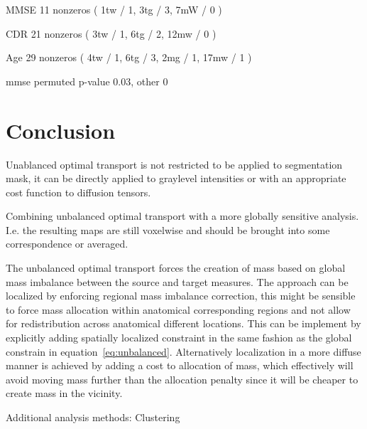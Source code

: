 \documentclass{llncs}
\begin{document}
MMSE  11 nonzeros ( 1tw / 1, 3tg / 3,  7mW / 0 )

CDR 21 nonzeros   ( 3tw / 1, 6tg / 2, 12mw / 0 )

Age 29 nonzeros   ( 4tw / 1, 6tg / 3,  2mg / 1, 17mw / 1 ) 

mmse permuted p-value 0.03, other 0

\section{Conclusion}

Unablanced optimal transport is not restricted to be applied to segmentation
mask, it can be directly applied to graylevel intensities or with an
appropriate cost function to diffusion tensors. 


Combining unbalanced optimal transport with a more globally sensitive analysis.
I.e. the resulting maps are still voxelwise and should be brought into some
correspondence or averaged.

The unbalanced optimal transport forces the creation of mass based on global
mass imbalance between the source and target measures. The approach can be
localized by enforcing regional mass imbalance correction, this might be
sensible to force mass allocation within anatomical corresponding regions and not
allow for redistribution across anatomical different locations. This can be
implement by explicitly adding spatially localized constraint in the same
fashion as the global constrain in equation~\ref{eq:unbalanced}. Alternatively
localization in a more diffuse manner is achieved by adding a cost to
allocation of mass, which effectively will avoid moving mass further than the
allocation penalty since it will be cheaper to create mass in the vicinity.

Additional analysis methods: Clustering



\end{document}
